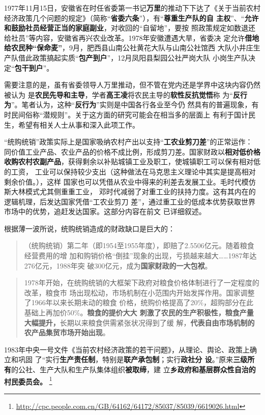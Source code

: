 1977年11月15日，安徽省在时任省委第一书记\textbf{万里}的推动下下达了《关于当前农村
经济政策几个问题的规定》（简称“\textbf{省委六条}”），有“\textbf{尊重生产队的自
  主权}”、“\textbf{允许和鼓励社员经营正当的家庭副业}，对收回的“自留地”，要按
照政策规定如数退还给社员”等内容，安徽省再兴农业改革。1978年安徽遭遇大旱，省委决
定允许\textbf{借地给农民种“保命麦”}，9月，肥西县山南公社黄花大队与山南公社馆西
大队小井庄生产队借此政策搞起实质“\textbf{包产到户}”，12月凤阳县梨园公社严岗大队
小岗生产队决定“\textbf{包干到户}”。

需要注意的是，虽有省委领导人万里推动，但不管在党内还是学界中这块内容仍然被认为
是\textbf{农民先导和主导}，学者\textbf{高王凌}将农民主导的\textbf{软性反抗觉悟}称
为“\textbf{反行为}”。笔者认为，这种“\textbf{反行为}”实则是中国各行各业至今仍
然具有的普遍现象，有时民间俗称“潜规则”。关于这方面的研究可能会在相当多的层面上
有利于国计民生，希望有相关人士从事和深入此项工作。

“统购统销”政策实际上是国家吸纳农村产出以支持“\textbf{工农业剪刀差}”的正常运作：
同价值工业产品、农业产品的价格不成比例，形成剪刀差。国家财政以\textbf{相对低价格
  收购农村农副产品}，获得剩余以补贴城镇工业及职工，使城镇职工可以保有相对低的工资，
工业可以保持较少支出（这种做法在马克思主义理论中其实是提高相对剩余价值。），这样
国家也可以凭借从农业中得来的利差去发展工业。毛时代模仿斯大林模式尤其侧重重工业，
邓时代减弱了对重工业的扶持力度。这有其内在的逻辑机理，后发达国家凭借“工农业剪刀
差”，通过重工业的低成本优势获取世界市场中的优势，追赶发达国家。这部分内容在前文
已详细叙述。

根据薄一波所说，统购统销造成的财政缺口是巨大的：
\begin{quotation}
  （统购统销）第二年（即1954至1955年度），即赔了2.5506亿元。随着粮食经营费用的增
  加和购销价格“倒挂”现象的出现，亏损越来越大……1987年达276亿元，1988年突
  破300亿元，成为\textbf{国家财政的一大包袱}。
\end{quotation}

\begin{quotation}
  1978年开始，在统购统销的大框架下政府对粮食价格体制进行了一定程度的改革，粮食市
  场出现松动，市场机制在小范围内开始发挥作用。国家调整了1966年以来长期未动的粮食
  价格，统购价格提高了20\%，超购部分在此基础上再加价50\%。\textbf{粮食的提价大大
    刺激了农民的生产积极性，粮食产量大幅提升，}长期以来粮食供需紧张状况得到了缓
  解，\textbf{代表自由市场机制的农产品集贸市场开始出现}。\cite{taochangsheng}
\end{quotation}

1983年中央一号文件《当前农村经济政策的若干问题》，从理论、舆论、政策上确立和巩固
了“实行\textbf{生产责任制}，特别是\textbf{联产承包制}；实行\textbf{政社分
  设}。”原来\textbf{三级所有}的公社、生产大队和生产队集体组织\textbf{被取缔}，建
立\textbf{乡政府和基层群众性自治的村民委员会。}
\footnote{\url{http://cpc.people.com.cn/GB/64162/64172/85037/85039/6619026.html}}

